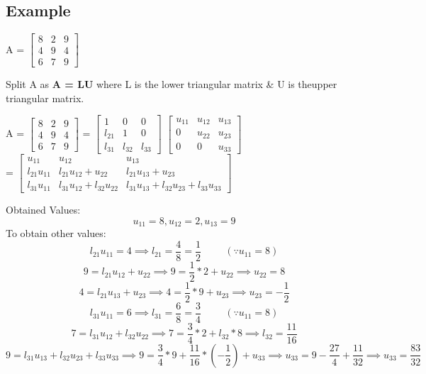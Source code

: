 \documentclass[a4paper,oneside]{book}
\begin{document}
\subsection{Example}
\begin{center}
A = $\begin{bmatrix}
8 & 2 & 9 \\
4 & 9 & 4 \\
6 & 7 & 9
\end{bmatrix}$ \end{center}
Split A as \textbf{A = LU} where L is the lower triangular matrix \& U is theupper triangular matrix.
\begin{center}
A = $\begin{bmatrix}
8 & 2 & 9 \\
4 & 9 & 4 \\
6 & 7 & 9
\end{bmatrix}$ = $\begin{bmatrix}
1 & 0 & 0 \\
l_{21} & 1 & 0 \\
l_{31} & l_{32} & l_{33}
\end{bmatrix}$ $\begin{bmatrix}
u_{11} & u_{12} & u_{13} \\
0 & u_{22} & u_{23} \\
0 & 0 & u_{33}
\end{bmatrix}$\\ = $\begin{bmatrix}
u_{11} & u_{12} & u_{13} \\
l_{21}u_{11} & l_{21}u_{12}+u_{22} & l_{21}u_{13}+u_{23} \\
l_{31}u_{11} & l_{31}u_{12}+l_{32}u_{22} & l_{31}u_{13}+l_{32}u_{23}+l_{33}u_{33}
\end{bmatrix}$
\end{center}
Obtained Values: $$u_{11} = 8, u_{12} = 2, u_{13} = 9$$
To obtain other values:\\
$$l_{21}u_{11} = 4 \implies l_{21} = \frac{4}{8} = \frac{1}{2} \hspace{1cm}(\because u_{11} = 8) $$
$$9 = l_{21}u_{12} + u_{22} \implies 9 = \frac{1}{2}*2 + u_{22} \implies u_{22} = 8$$
$$4 = l_{21}u_{13} + u_{23} \implies 4 = \frac{1}{2}*9 + u_{23} \implies u_{23} = -\frac{1}{2}$$
$$l_{31}u_{11} = 6 \implies l_{31} = \frac{6}{8} = \frac{3}{4} \hspace{1cm}(\because u_{11} = 8) $$
$$7 = l_{31}u_{12} + l_{32}u_{22} \implies 7 = \frac{3}{4}*2 + l_{32}*8 \implies l_{32} = \frac{11}{16}$$
$$9 = l_{31}u_{13} + l_{32}u_{23} + l_{33}u_{33} \implies 9 = \frac{3}{4}*9 + \frac{11}{16}*\left(-\frac{1}{2}\right) + u_{33} \implies u_{33} = 9 - \frac{27}{4} + \frac{11}{32} \implies u_{33} = \frac{83}{32}$$
\end{document}
